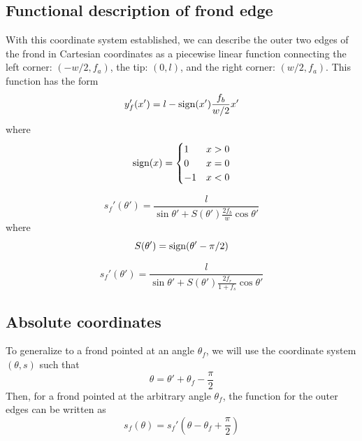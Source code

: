 \subsection{Functional description of frond edge}
With this coordinate system established, we can describe the outer two edges of the frond in Cartesian coordinates as a piecewise linear function connecting the left corner: $(-w/2,f_a)$, the tip: $(0,l)$, and the right corner: $(w/2,f_a)$.
This function has the form
\begin{equation}
	y'_f(x') = l-\mbox{sign}(x')\frac{f_b}{w/2}x'
\end{equation}
where
\begin{align}
	\mbox{sign}(x) = 
	\begin{cases}
		1 & x > 0 \\
		0 & x = 0 \\
		-1 & x < 0 \\
	\end{cases}
\end{align}

\begin{equation}
	s_f'(\theta') = \frac{l}{\sin\theta' + S(\theta')\frac{2f_b}{w}\cos\theta'}
\end{equation}
where
\begin{equation}
	S(\theta') = \mbox{sign}(\theta'-\pi/2)
\end{equation}

\begin{equation}
	\label{eq:rf_rel}
	s_f'(\theta') = \frac{l}{\sin\theta' + S(\theta')\frac{2f_r}{1+f_s}\cos\theta'}
\end{equation}

\subsection{Absolute coordinates}
\label{sec:abs_coords}
To generalize to a frond pointed at an angle $\theta_f$, we will use the coordinate system $(\theta,s)$ such that
\begin{equation}
	\theta = \theta' + \theta_f - \frac{\pi}{2}
\end{equation}
Then, for a frond pointed at the arbitrary angle $\theta_f$, the function for the outer edges can be written as 
\begin{equation}
	\label{eq:rf_abs}
	s_f(\theta) = s_f'\left(\theta - \theta_f + \frac{\pi}{2} \right)
\end{equation}


